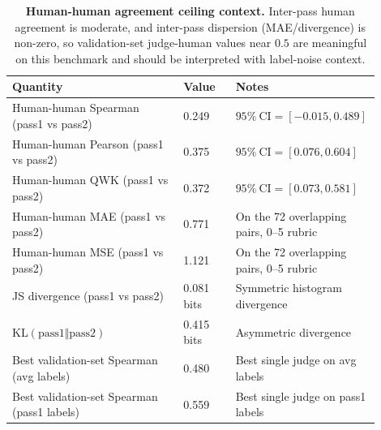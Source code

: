 \begin{table}[t]
  \centering
  \small
  \begin{tabular}{@{}p{0.46\linewidth}p{0.14\linewidth}p{0.30\linewidth}@{}}
    \toprule
    \textbf{Quantity}                           & \textbf{Value} & \textbf{Notes}                      \\
    \midrule
    Human-human Spearman (pass1 vs pass2)       & 0.249          & \(95\%\ \text{CI}=[-0.015, 0.489]\) \\
    Human-human Pearson (pass1 vs pass2)        & 0.375          & \(95\%\ \text{CI}=[0.076, 0.604]\)  \\
    Human-human QWK (pass1 vs pass2)            & 0.372          & \(95\%\ \text{CI}=[0.073, 0.581]\)  \\
    Human-human MAE (pass1 vs pass2)            & 0.771          & On the 72 overlapping pairs, 0--5 rubric \\
    Human-human MSE (pass1 vs pass2)            & 1.121          & On the 72 overlapping pairs, 0--5 rubric \\
    JS divergence (pass1 vs pass2)              & 0.081 bits     & Symmetric histogram divergence      \\
    KL\((\text{pass1}\Vert\text{pass2})\)       & 0.415 bits     & Asymmetric divergence               \\
    Best validation-set Spearman (avg labels)   & 0.480          & Best single judge on avg labels     \\
    Best validation-set Spearman (pass1 labels) & 0.559          & Best single judge on pass1 labels   \\
    \bottomrule
  \end{tabular}
  \caption{\textbf{Human-human agreement ceiling context.} Inter-pass human agreement is moderate, and inter-pass dispersion (MAE/divergence) is non-zero, so validation-set judge-human values near \(0.5\) are meaningful on this benchmark and should be interpreted with label-noise context.}
  \label{tab:app-human-human-ceiling}
\end{table}

